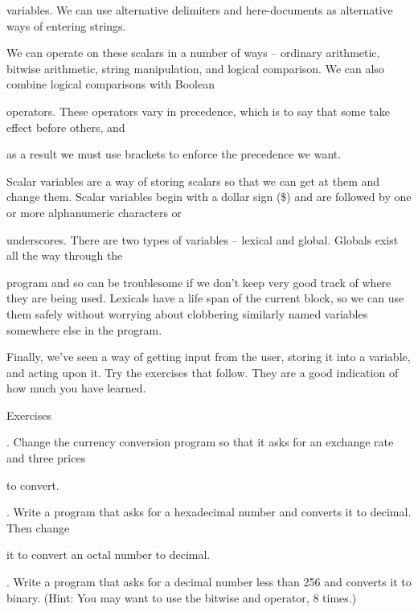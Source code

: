 \documentclass[a4paper,11pt]{book}
\begin{document}
\noindent variables. We can use alternative delimiters and here-documents as alternative ways of entering strings.

\noindent 

\noindent We can operate on these scalars in a number of ways -- ordinary arithmetic, bitwise arithmetic, string manipulation, and logical comparison. We can also combine logical comparisons with Boolean

\noindent operators. These operators vary in precedence, which is to say that some take effect before others, and

\noindent as a result we must use brackets to enforce the precedence we want.

\noindent 

\noindent Scalar variables are a way of storing scalars so that we can get at them and change them. Scalar variables begin with a dollar sign (\$) and are followed by one or more alphanumeric characters or

\noindent underscores. There are two types of variables -- lexical and global. Globals exist all the way through the

\noindent program and so can be troublesome if we don't keep very good track of where they are being used. Lexicals have a life span of the current block, so we can use them safely without worrying about clobbering similarly named variables somewhere else in the program.

\noindent 

\noindent Finally, we've seen a way of getting input from the user, storing it into a variable, and acting upon it. Try the exercises that follow. They are a good indication of how much you have learned.

\noindent 

\noindent Exercises

\noindent 

.   Change the currency conversion program so that it asks for an exchange rate and three prices

\noindent to convert.

\noindent 

.   Write a program that asks for a hexadecimal number and converts it to decimal. Then change

\noindent it to convert an octal number to decimal.

\noindent 

.   Write a program that asks for a decimal number less than 256 and converts it to binary. (Hint: You may want to use the bitwise and operator, 8 times.)
\end{document}
